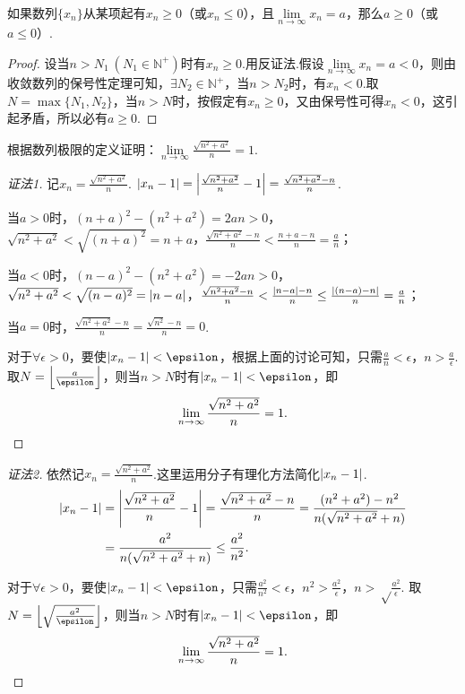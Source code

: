 \begin{corollary}
如果数列\(\{x_n\}\)从某项起有\(x_n \geq 0\)（或\(x_n \leq 0\)），且\(\lim\limits_{n\to\infty}x_n = a\)，那么\(a \geq 0\)（或\(a \leq 0\)）.
\begin{proof}
设当\(n > N_1\ (N_1 \in \mathbb{N}^+)\)时有\(x_n \geq 0\).用反证法.假设\(\lim\limits_{n\to\infty}x_n = a < 0\)，则由收敛数列的保号性定理可知，\(\exists N_2 \in \mathbb{N}^+\)，当\(n > N_2\)时，有\(x_n < 0\).取\(N = \max\{N_1,N_2\}\)，当\(n > N\)时，按假定有\(x_n \geq 0\)，又由保号性可得\(x_n < 0\)，这引起矛盾，所以必有\(a \geq 0\).
\end{proof}
\end{corollary}

\begin{example}
\def\l{\lim\limits_{n\to\infty}}
\def\ys{\l \frac{\sqrt{n^2+a^2}}{n}}
根据数列极限的定义证明：\(\ys = 1\).
\begin{proof}[证法1]
记\(x_n = \frac{\sqrt{n^2+a^2}}{n}\).
\(\abs{x_n-1} = \abs{\frac{\sqrt{n^2+a^2}}{n}-1} = \frac{\sqrt{n^2+a^2}-n}{n}\).

当\(a > 0\)时，\((n+a)^2-(n^2+a^2)=2an>0\)，\(\sqrt{n^2+a^2}<\sqrt{(n+a)^2}=n+a\)，\(\frac{\sqrt{n^2+a^2}-n}{n} < \frac{n+a-n}{n} = \frac{a}{n}\)；

当\(a < 0\)时，\((n-a)^2-(n^2+a^2)=-2an>0\)，\(\sqrt{n^2+a^2}<\sqrt{(n-a)^2}=\abs{n-a}\)，\(\frac{\sqrt{n^2+a^2}-n}{n} < \frac{\abs{n-a}-n}{n} \leq \frac{\abs{(n-a)-n}}{n} = \frac{a}{n}\)；

当\(a = 0\)时，\(\frac{\sqrt{n^2+a^2}-n}{n} = \frac{\sqrt{n^2}-n}{n} = 0\).

对于\(\forall\epsilon>0\)，要使\(\abs{x_n-1}<\epsilon\)，根据上面的讨论可知，只需\(\frac{a}{n}<\epsilon\)，\(n>\frac{a}{\epsilon}\).
取\(N = \floor*{\frac{a}{\epsilon}}\)，则当\(n>N\)时有\(\abs{x_n-1}<\epsilon\)，即\[
\ys = 1.
\qedhere
\]
\end{proof}
\begin{proof}[证法2]
依然记\(x_n = \frac{\sqrt{n^2+a^2}}{n}\).这里运用分子有理化方法简化\(\abs{x_n-1}\).
\begin{align*}
\abs{x_n-1} &= \abs{\frac{\sqrt{n^2+a^2}}{n}-1}
= \frac{\sqrt{n^2+a^2}-n}{n}
= \frac{(n^2+a^2)-n^2}{n (\sqrt{n^2+a^2}+n)} \\
&= \frac{a^2}{n (\sqrt{n^2+a^2}+n)}
\leq \frac{a^2}{n^2}.
\end{align*}

对于\(\forall\epsilon>0\)，要使\(\abs{x_n-1}<\epsilon\)，只需\(\frac{a^2}{n^2}<\epsilon\)，\(n^2>\frac{a^2}{\epsilon}\)，\(n>\sqrt\frac{a^2}{\epsilon}\).
取\(N = \floor*{\sqrt\frac{a^2}{\epsilon}}\)，则当\(n>N\)时有\(\abs{x_n-1}<\epsilon\)，即\[
\ys = 1.
\qedhere
\]
\end{proof}
\end{example}


